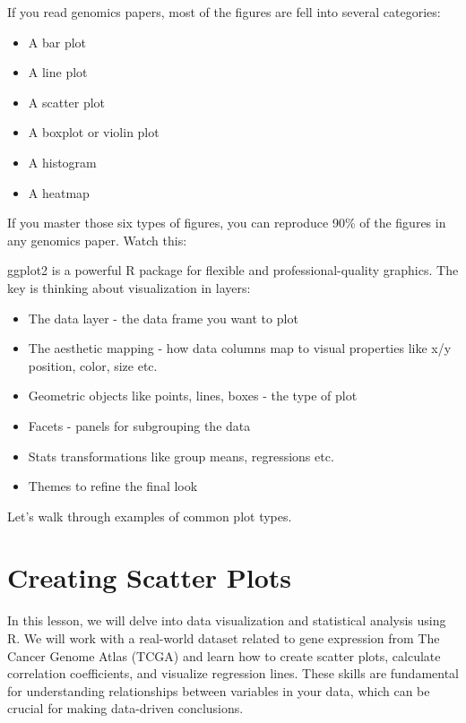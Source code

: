 \documentclass[
]{book}
\begin{document}
If you read genomics papers, most of the figures are fell into several categories:

\begin{itemize}
\item
  A bar plot
\item
  A line plot
\item
  A scatter plot
\item
  A boxplot or violin plot
\item
  A histogram
\item
  A heatmap
\end{itemize}

If you master those six types of figures, you can reproduce 90\% of the figures in any genomics paper. Watch this:

ggplot2 is a powerful R package for flexible and professional-quality graphics. The key is thinking about visualization in layers:

\begin{itemize}
\item
  The data layer - the data frame you want to plot
\item
  The aesthetic mapping - how data columns map to visual properties like x/y position, color, size etc.
\item
  Geometric objects like points, lines, boxes - the type of plot
\item
  Facets - panels for subgrouping the data
\item
  Stats transformations like group means, regressions etc.
\item
  Themes to refine the final look
\end{itemize}

Let's walk through examples of common plot types.

\hypertarget{creating-scatter-plots}{%
\section{Creating Scatter Plots}\label{creating-scatter-plots}}

In this lesson, we will delve into data visualization and statistical analysis using R. We will work with a real-world dataset related to gene expression from The Cancer Genome Atlas (TCGA) and learn how to create scatter plots, calculate correlation coefficients, and visualize regression lines. These skills are fundamental for understanding relationships between variables in your data, which can be crucial for making data-driven conclusions.
\end{document}
